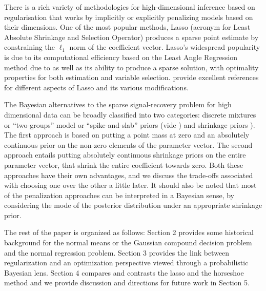\documentclass[11pt]{article}
\begin{document}
There is a rich variety of methodologies for high-dimensional inference based on regularisation that works by implicitly or explicitly penalizing models based on their dimensions. One of the most popular methods, Lasso (acronym for Least Absolute Shrinkage and Selection Operator) produces a sparse point estimate by constraining the $\ell_1$ norm of the coefficient vector. Lasso's widespread popularity is due to its computational efficiency based on the Least Angle Regression method due to \cite{efron_least_2004} as well as its ability to produce a sparse solution, with optimality properties for both estimation and variable selection. \cite{buhlmann2011statistics, james2013introduction, hastie2015statistical} provide excellent references for different aspects of Lasso and its various modifications. \par 

The Bayesian alternatives to the sparse signal-recovery problem for high
dimensional data can be broadly classified into two categories: discrete
mixtures or ``two-groups'' model or ``spike-and-slab'' priors (vide
\citet{johnstone2004needles,efron2010large,efron2008microarrays,bogdan2011asymptotic})
and shrinkage priors
\cite{armagan2011generalized,armagan2013generalized,carvalho2009handling,carvalho2010horseshoe,griffin2005alternative,polson2010shrink,castillo2012needles}).
The first approach is based on putting a point mass at zero and an absolutely
continuous prior on the non-zero elements of the parameter vector.  The second
approach entails putting absolutely continuous shrinkage priors on the entire
parameter vector, that shrink the entire coefficient towards zero. Both these
approaches have their own advantages, and we discuss the trade-offs associated
with choosing one over the other a little later.  It should also be noted that
most of the penalization approaches can be interpreted in a Bayesian sense, by
considering the mode of the posterior distribution under an appropriate
shrinkage prior. 


The rest of the paper is organized as follows: Section 2 provides some historical background for the normal means or the Gaussian compound decision problem and the normal regression problem. Section 3 provides the link between regularization and an optimization perspective viewed through a probabilistic Bayesian lens. Section 4 compares and contrasts the lasso and the horseshoe method and we provide discussion and directions for future work in Section 5. 
\end{document}
